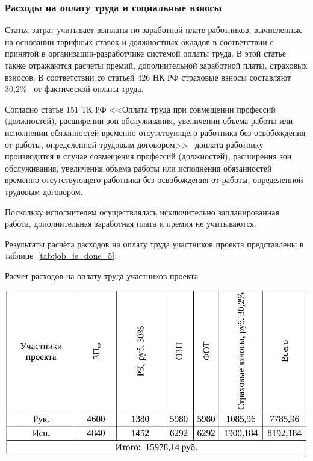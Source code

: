 \subsubsection{Расходы на оплату труда и социальные взносы}

Статья затрат учитывает выплаты по заработной плате работников, 
вычисленные на основании тарифных ставок и должностных окладов в соответствии с принятой в 
организации-разработчике системой оплаты труда. В этой статье также отражаются расчеты
премий, дополнительной заработной платы, страховых взносов.
В соответствии со статьей 426 НК РФ страховые взносы составляют 30,2\%~\cite{strax} от фактической
оплаты труда.

Согласно статье 151 ТК РФ <<Оплата труда при совмещении профессий (должностей), 
расширении зон обслуживания, увеличении объема работы или исполнении обязанностей 
временно отсутствующего работника без освобождения от работы, определенной трудовым договором>>~\cite{tk_rf}
доплата работнику производится в случае совмещения профессий (должностей), 
расширения зон обслуживания, увеличения объема работы или исполнения 
обязанностей временно отсутствующего работника без освобождения от работы, определенной трудовым договором.

Поскольку исполнителем осуществлялась исключительно запланированная работа, дополнительная заработная
плата и премия не учитываются.

Результаты расчёта расходов на оплату труда участников проекта представлены в таблице~\ref{tab:job_is_done_5}.

\begin{table}[!ht]
\caption{Расчет расходов на оплату труда участников проекта}
\centering
\includegraphics[page=1, width=1\linewidth]{tables/economics/schedule_5.pdf}
\label{tab:job_is_done_5}
\end{table}



